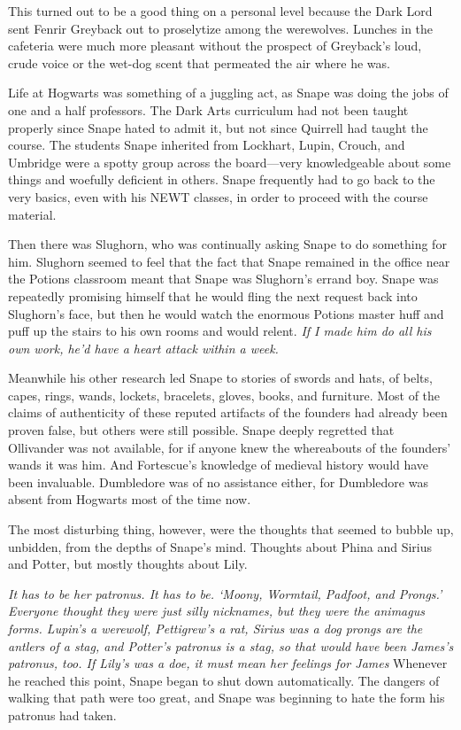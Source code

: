 This turned out to be a good thing on a personal level because the Dark Lord sent Fenrir Greyback out to proselytize among the werewolves. Lunches in the cafeteria were much more pleasant without the prospect of Greyback's loud, crude voice or the wet-dog scent that permeated the air where he was.

Life at Hogwarts was something of a juggling act, as Snape was doing the jobs of one and a half professors. The Dark Arts curriculum had not been taught properly since{\el} Snape hated to admit it, but not since Quirrell had taught the course. The students Snape inherited from Lockhart, Lupin, Crouch, and Umbridge were a spotty group across the board—very knowledgeable about some things and woefully deficient in others. Snape frequently had to go back to the very basics, even with his NEWT classes, in order to proceed with the course material.

Then there was Slughorn, who was continually asking Snape to do something for him. Slughorn seemed to feel that the fact that Snape remained in the office near the Potions classroom meant that Snape was Slughorn's errand boy. Snape was repeatedly promising himself that he would fling the next request back into Slughorn's face, but then he would watch the enormous Potions master huff and puff up the stairs to his own rooms and would relent. \emph{If I made him do all his own work, he'd have a heart attack within a week.}

Meanwhile his other research led Snape to stories of swords and hats, of belts, capes, rings, wands, lockets, bracelets, gloves, books, and furniture. Most of the claims of authenticity of these reputed artifacts of the founders had already been proven false, but others were still possible. Snape deeply regretted that Ollivander was not available, for if anyone knew the whereabouts of the founders' wands it was him. And Fortescue's knowledge of medieval history would have been invaluable. Dumbledore was of no assistance either, for Dumbledore was absent from Hogwarts most of the time now.

The most disturbing thing, however, were the thoughts that seemed to bubble up, unbidden, from the depths of Snape's mind. Thoughts about Phina and Sirius and Potter, but mostly thoughts about Lily.

\emph{It has to be her patronus. It has to be. `Moony, Wormtail, Padfoot, and Prongs.' Everyone thought they were just silly nicknames, but they were the animagus forms. Lupin's a werewolf, Pettigrew's a rat, Sirius was a dog{\el} prongs are the antlers of a stag, and Potter's patronus is a stag, so that would have been James's patronus, too. If Lily's was a doe, it must mean her feelings for James{\el}} Whenever he reached this point, Snape began to shut down automatically. The dangers of walking that path were too great, and Snape was beginning to hate the form his patronus had taken.

